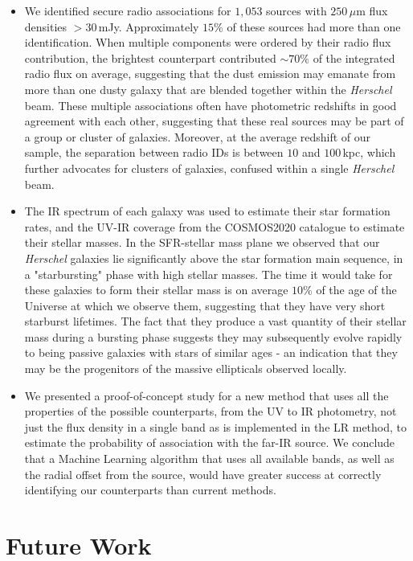 \begin{itemize}
    \item We identified secure radio associations for $1,053$ sources with $250\,\mu$m flux densities $>30\,$mJy. Approximately $15\%$ of these sources had more than one identification. When multiple components were ordered by their radio flux contribution, the brightest counterpart contributed $\sim70\%$ of the integrated radio flux on average, suggesting that the dust emission may emanate from more than one dusty galaxy that are blended together within the \textit{Herschel} beam. These multiple associations often have photometric redshifts in good agreement with each other, suggesting that these real sources may be part of a group or cluster of galaxies. Moreover, at the average redshift of our sample, the separation between radio IDs is between $10$ and $100\,$kpc, which further advocates for clusters of galaxies, confused within a single \textit{Herschel} beam.
    \item The IR spectrum of each galaxy was used to estimate their star formation rates, and the UV-IR coverage from the COSMOS2020 catalogue to estimate their stellar masses. In the SFR-stellar mass plane we observed that our \textit{Herschel} galaxies lie significantly above the star formation main sequence, in a "starbursting" phase with high stellar masses. The time it would take for these galaxies to form their stellar mass is on average $10\%$ of the age of the Universe at which we observe them, suggesting that they have very short starburst lifetimes. The fact that they produce a vast quantity of their stellar mass during a bursting phase suggests they may subsequently evolve rapidly to being passive galaxies with stars of similar ages - an indication that they may be the progenitors of the massive ellipticals observed locally.
    \item We presented a proof-of-concept study for a new method that uses all the properties of the possible counterparts, from the UV to IR photometry, not just the flux density in a single band as is implemented in the LR method, to estimate the probability of association with the far-IR source. We conclude that a Machine Learning algorithm that uses all available bands, as well as the radial offset from the source, would have greater success at correctly identifying our counterparts than current methods.
\end{itemize}

\section{Future Work}

